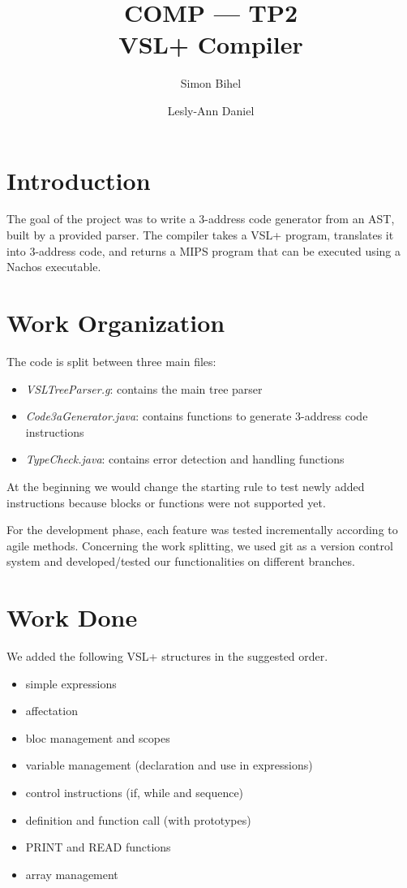 \documentclass[a4paper,11pt,english]{article}
\title{COMP --- TP2\\VSL+ Compiler}
\author{Simon Bihel \and Lesly-Ann Daniel}
\begin{document}
\maketitle

\section{Introduction}
The goal of the project was to write a 3-address code generator from an AST, built by a provided parser.
The compiler takes a VSL+ program, translates it into 3-address code, and returns a MIPS program that can be executed using a Nachos executable.

\section{Work Organization}
The code is split between three main files:
\begin{itemize}
 \item \textit{VSLTreeParser.g}: contains the main tree parser
 \item \textit{Code3aGenerator.java}: contains functions to generate 3-address code instructions
 \item \textit{TypeCheck.java}: contains error detection and handling functions
\end{itemize}
At the beginning we would change the starting rule to test newly added instructions because blocks or functions were not supported yet.

For the development phase, each feature was tested incrementally according to agile methods.
Concerning the work splitting, we used git as a version control system and developed/tested our functionalities on different branches.

\section{Work Done}
We added the following VSL+ structures in the suggested order.
\begin{itemize}
 \item simple expressions
 \item affectation
 \item bloc management and scopes
 \item variable management (declaration and use in expressions)
 \item control instructions (if, while and sequence)
 \item definition and function call (with prototypes)
 \item PRINT and READ functions
 \item array management
\end{itemize}
\end{document}
